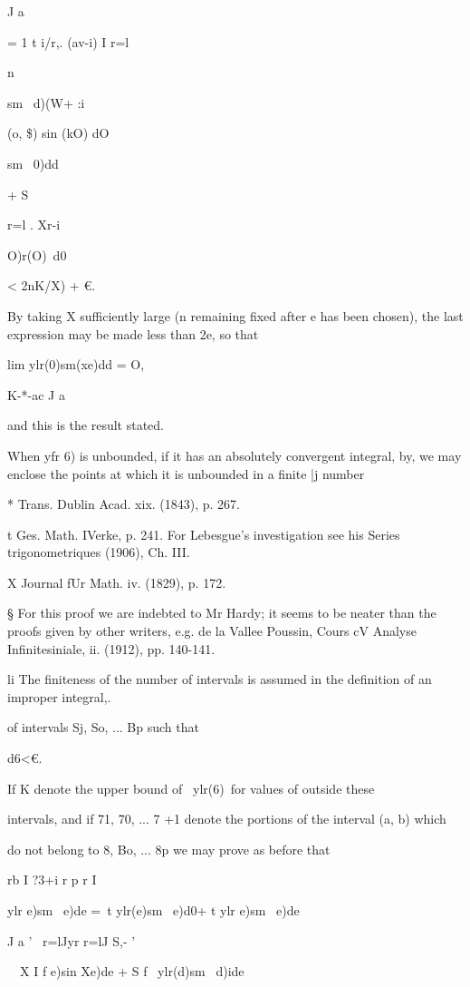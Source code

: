 J a

= 1 t i/r,. (av-i) I r=l

n

sm \ d)(W+ :i

(o, \$) sin (kO) dO

sm \ 0)dd

+ S

r=l . Xr-i

O)r(O)\ d0

< 2nK/X) + €.

By taking X sufficiently large (n remaining fixed after e has been
chosen), the last expression may be made less than 2e, so that

lim ylr(0)sm(xe)dd = O,

K-*-ac J a

and this is the result stated.

When yfr 6) is unbounded, if it has an absolutely convergent integral,
by, we may enclose the points at which it is unbounded in a
finite |j number

* Trans. Dublin Acad. xix. (1843), p. 267.

t Ges. Math. IVerke, p. 241. For Lebesgue's investigation see his
Series trigonometriques (1906), Ch. III.

X Journal fUr Math. iv. (1829), p. 172.

§ For this proof we are indebted to Mr Hardy; it seems to be neater
than the proofs given by other writers, e.g. de la Vallee Poussin,
Cours cV Analyse Infinitesiniale, ii. (1912), pp. 140-141.

li The finiteness of the number of intervals is assumed in the
definition of an improper integral,.

%
%

of intervals Sj, So, ... Bp such that

d6<€.

If K denote the upper bound of \ ylr(6)\ for values of outside these

intervals, and if 71, 70, ... 7 +1 denote the portions of the interval
(a, b) which

do not belong to 8, Bo, ... 8p we may prove as before that

rb I ?3+i r p r I

ylr e)sm \ e)de =\ t ylr(e)sm \ e)d0+ t ylr e)sm \ e)de\

J a ' \ r=lJyr r=lJ S,- '

 \ \ X I f e)sin Xe)de + S f \ ylr(d)sm \ d)ide

